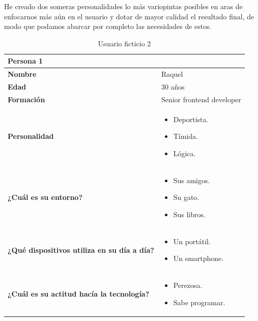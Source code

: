 He creado dos someras personalidades lo más variopintas posibles en aras de enfocarnos más
aún en el usuario y dotar de mayor calidad el resultado final, de modo que podamos abarcar
por completo las necesidades de estos.

\begin{table}[H]
   \begin{center}
      \begin{tabular}{| p{} | p{} |}
         \hline
         Persona 1 &  \\ \hline
         \textbf{Nombre} & Raquel \\
         \textbf{Edad} & 30 años \\
         \textbf{Formación} & Senior frontend developer \\
         \textbf{Personalidad} & \begin{itemize}
                \item Deportista.
                \item Tímida.
                \item Lógica. \end{itemize} \\
         \textbf{¿Cuál es su entorno?} & \begin{itemize}
                \item Sus amigos.
                \item Su gato.
                \item Sus libros. \end{itemize} \\
         \textbf{¿Qué dispositivos utiliza en su día a día?} & \begin{itemize}
                \item Un portátil.
                \item Un smartphone. \end{itemize} \\
            \textbf{¿Cuál es su actitud hacía la tecnología?} & \begin{itemize}
                \item Perezosa.
                \item Sabe programar. \end{itemize} \\
            \hline
      \end{tabular}
      \caption{Usuario ficticio 2}
   \end{center}
\end{table}

